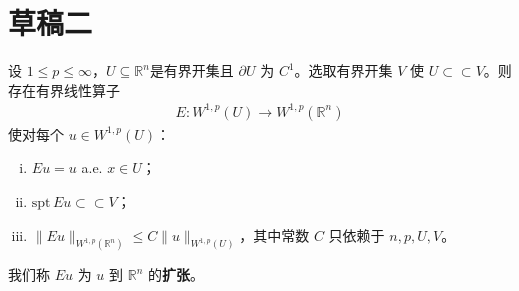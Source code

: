 \documentclass[../../main.tex]{subfiles}%
\begin{document}
\section{草稿二}


\begin{theorem}[扩张定理]\label{theorem:ch05-扩张定理}
设 $1\leqslant p\leqslant\infty$，$U\subseteq \mathbb{R}^n$是有界开集且 $\partial U$ 为 $C^{1}$。选取有界开集 $V$ 使 $U\subset \subset V$。则存在有界线性算子
\begin{align}
E:W^{1,p}(U)\to W^{1,p}(\mathbb{R}^{n})
\end{align}
使对每个 $u\in W^{1,p}(U)$：
\begin{enumerate}[(i)]
\item $Eu=u$ a.e. $x\in U$；
\item $\text{spt}\,Eu\subset \subset V$；
\item $\|Eu\|_{W^{1,p}(\mathbb{R}^{n})}\leqslant C\|u\|_{W^{1,p}(U)}$，其中常数 $C$ 只依赖于 $n,p,U,V$。
\end{enumerate}
我们称 $Eu$ 为 $u$ 到 $\mathbb{R}^{n}$ 的\textbf{扩张}。
\end{theorem}
\end{document}
